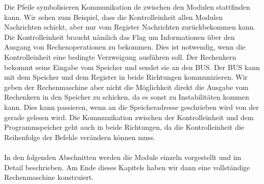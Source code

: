 \documentclass[11pt,a4paper,leqno]{report}
\numberwithin{equation}{chapter}
\begin{document}
\noindent
Die Pfeile symbolisieren  Kommunikation de zwischen den Modulen stattfinden kann. Wir sehen zum Beispiel, dass die Kontrolleinheit allen Modulen Nachrichten schickt, aber nur vom Register Nachrichten zur\"uckbekommen kann. Die Kontrolleinheit braucht n\"amlich das Flag um Informationen \"uber den Ausgang von Rechenoperationen zu bekommen. Dies ist notwendig, wenn die Kontrolleinheit eine bedingte Verzweigung ausf\"uhren soll.
Der Rechenkern bekommt seine Eingabe vom Speicher und sendet sie an den BUS. Der BUS kann mit dem Speicher und dem Register in beide Richtungen kommunizieren. Wir geben der Rechenmaschine aber nicht die M\"oglichkeit direkt die Ausgabe vom Rechenkern in den Speicher zu schicken, da es sonst zu Instabilit\"aten kommen kann. Dies kann passieren, wenn an die Speicheradresse geschrieben wird von der gerade gelesen wird. Die Kommunikation zwischen der Kontrolleinheit und dem Programmspeicher geht auch in beide Richtungen, da die Kontrolleinheit die Reihenfolge der Befehle ver\"andern k\"onnen muss.
\\
\\
In den folgenden Abschnitten werden die Module einzeln vorgestellt und im Detail beschrieben. Am Ende dieses Kapitels haben wir dann eine vollst\"andige Rechenmaschine konstruiert.
\newpage
\end{document}
